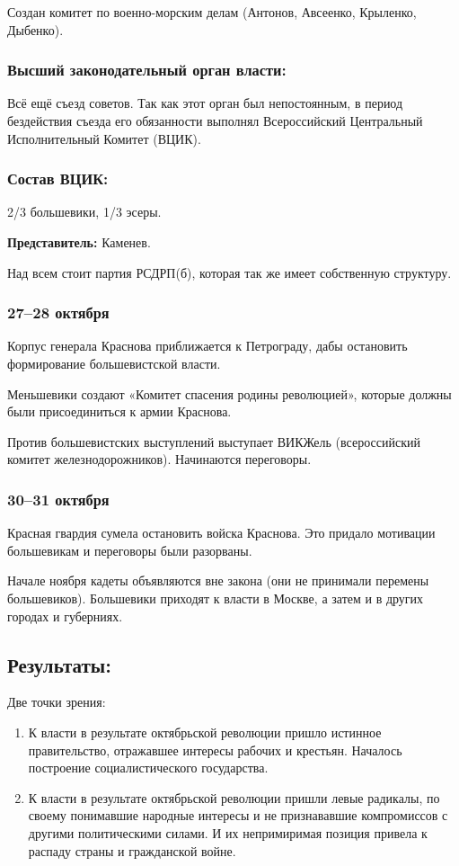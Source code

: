 Создан комитет по военно-морским делам (Антонов, Авсеенко, Крыленко, Дыбенко).

\subsubsection{\textbf{Высший законодательный орган власти:}}

Всё ещё съезд советов.
Так как этот орган был непостоянным, в период бездействия съезда его обязанности выполнял Всероссийский Центральный Исполнительный Комитет (ВЦИК).

\subsubsection{\textbf{Состав ВЦИК:}}

2/3 большевики, 1/3 эсеры.

\textbf{Представитель:} Каменев.

Над всем стоит партия РСДРП(б), которая так же имеет собственную структуру.

\subsubsection{\textbf{27--28 октября}}

Корпус генерала Краснова приближается к Петрограду, дабы остановить формирование большевистской власти.

Меньшевики создают «Комитет спасения родины революцией», которые должны были присоединиться к армии Краснова.

Против большевистских выступлений выступает ВИКЖель (всероссийский комитет железнодорожников). Начинаются переговоры.

\subsubsection{\textbf{30--31 октября}}


Красная гвардия сумела остановить войска Краснова. Это придало мотивации большевикам и переговоры были разорваны.

Начале ноября кадеты объявляются вне закона (они не принимали перемены большевиков). Большевики приходят к власти в Москве, а затем и в других городах и губерниях.

\subsection{Результаты:}

Две точки зрения:

\begin{enumerate}
    \item К власти в результате октябрьской революции пришло истинное правительство, отражавшее интересы рабочих и крестьян. Началось построение социалистического государства.
    \item К власти в результате октябрьской революции пришли левые радикалы, по своему понимавшие народные интересы и не признававшие компромиссов с другими политическими силами. И их непримиримая позиция привела к распаду страны и гражданской войне.
\end{enumerate}